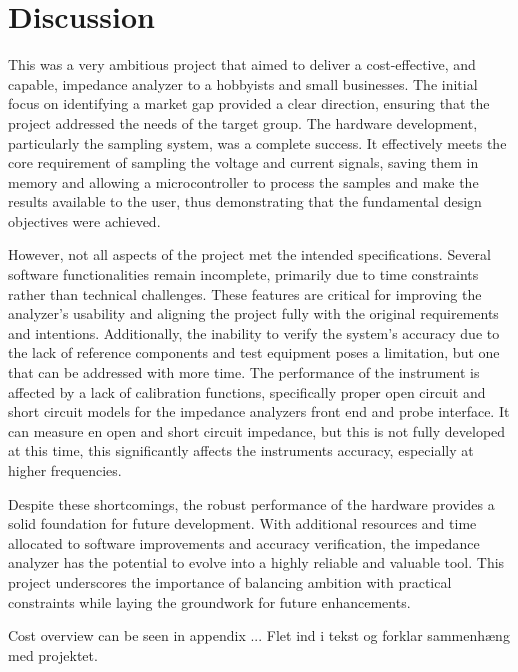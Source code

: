 \chapter{Discussion} \label{ch:Discussion}

This was a very ambitious project that aimed to deliver a cost-effective, and capable, impedance analyzer to a hobbyists and small businesses. The initial focus on identifying a market gap provided a clear direction, ensuring that the project addressed the needs of the target group. The hardware development, particularly the sampling system, was a complete success. It effectively meets the core requirement of sampling the voltage and current signals, saving them in memory and allowing a microcontroller to process the samples and make the results available to the user, thus demonstrating that the fundamental design objectives were achieved.

However, not all aspects of the project met the intended specifications. Several software functionalities remain incomplete, primarily due to time constraints rather than technical challenges. These features are critical for improving the analyzer's usability and aligning the project fully with the original requirements and intentions. Additionally, the inability to verify the system's accuracy due to the lack of reference components and test equipment poses a limitation, but one that can be addressed with more time. The performance of the instrument is affected by a lack of calibration functions, specifically proper open circuit and short circuit models for the impedance analyzers front end and probe interface. It can measure en open and short circuit impedance, but this is not fully developed at this time, this significantly affects the instruments accuracy, especially at higher frequencies.

Despite these shortcomings, the robust performance of the hardware provides a solid foundation for future development. With additional resources and time allocated to software improvements and accuracy verification, the impedance analyzer has the potential to evolve into a highly reliable and valuable tool. This project underscores the importance of balancing ambition with practical constraints while laying the groundwork for future enhancements.

Cost overview can be seen in appendix ... Flet ind i tekst og forklar sammenhæng med projektet.